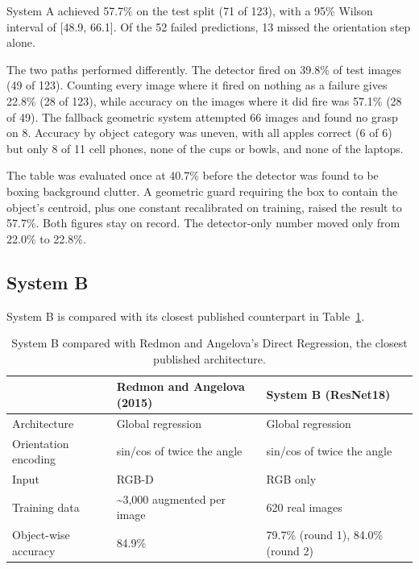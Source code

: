 \documentclass[12pt,letterpaper]{article}
\begin{document}
System A achieved 57.7\% on the test split (71 of 123), with a 95\%
Wilson interval of [48.9, 66.1]. Of the 52 failed predictions, 13
missed the orientation step alone.

The two paths performed differently. The detector fired on 39.8\% of
test images (49 of 123). Counting every image where it fired on nothing
as a failure gives 22.8\% (28 of 123), while accuracy on the images
where it did fire was 57.1\% (28 of 49). The fallback geometric system
attempted 66 images and found no grasp on 8. Accuracy by object
category was uneven, with all apples correct (6 of 6) but only 8 of 11
cell phones, none of the cups or bowls, and none of the laptops.

The table was evaluated once at 40.7\% before the detector was found to
be boxing background clutter. A geometric guard requiring the box to
contain the object's centroid, plus one constant recalibrated on
training, raised the result to 57.7\%. Both figures stay on record. The
detector-only number moved only from 22.0\% to 22.8\%.

\subsection{System B}

System B is compared with its closest published counterpart in
Table~\ref{tab:redmon}.

\begin{table}[H]
\centering
\caption{System B compared with Redmon and Angelova's Direct
Regression, the closest published architecture.}
\label{tab:redmon}
\begin{tabular}{lll}
\toprule
 & Redmon and Angelova (2015) & System B (ResNet18) \\
\midrule
Architecture         & Global regression & Global regression \\
Orientation encoding & sin/cos of twice the angle
                     & sin/cos of twice the angle \\
Input                & RGB-D & RGB only \\
Training data        & \textasciitilde{}3,000 augmented per image
                     & 620 real images \\
Object-wise accuracy & 84.9\% & 79.7\% (round 1), 84.0\% (round 2) \\
\bottomrule
\end{tabular}
\end{table}
\end{document}
